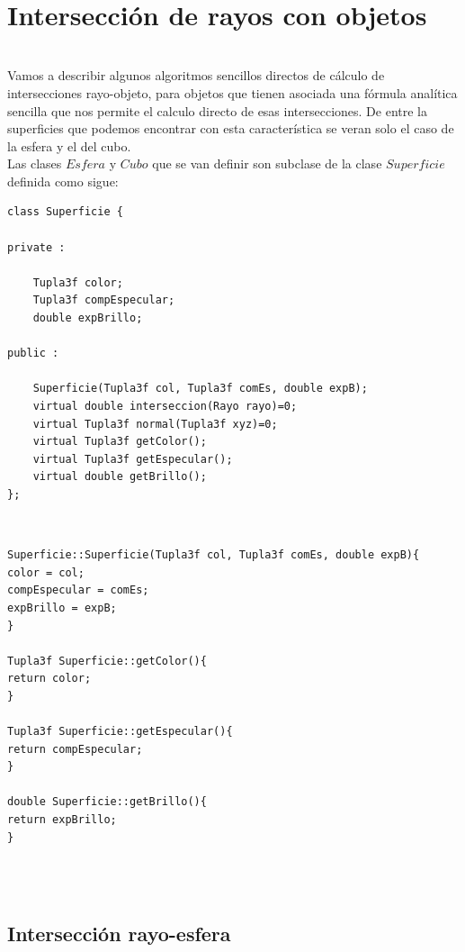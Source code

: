 ${ }$\\
\section{Intersección de rayos con objetos}\label{cap:intRO}
${ }$\\

Vamos a describir algunos algoritmos sencillos directos de cálculo de intersecciones rayo-objeto, para objetos que tienen asociada una fórmula analítica sencilla que nos permite el calculo directo de esas intersecciones. De entre la superficies que podemos encontrar con esta característica se veran solo el caso de la esfera y el del cubo.
${ }$\\

Las clases $Esfera$ y $Cubo$ que se van definir son subclase de la clase $Superficie$ definida como sigue:
${ }$\\

\begin{lstlisting}[style=Consola]
class Superficie {

private :

	Tupla3f color;
	Tupla3f compEspecular;
	double expBrillo;

public :

	Superficie(Tupla3f col, Tupla3f comEs, double expB);
	virtual double interseccion(Rayo rayo)=0;
	virtual Tupla3f normal(Tupla3f xyz)=0;
	virtual Tupla3f getColor();
	virtual Tupla3f getEspecular();
	virtual double getBrillo();
};
\end{lstlisting}
${ }$\\

\begin{lstlisting}[style=Consola]
Superficie::Superficie(Tupla3f col, Tupla3f comEs, double expB){
color = col;
compEspecular = comEs;
expBrillo = expB;
}

Tupla3f Superficie::getColor(){
return color;
}

Tupla3f Superficie::getEspecular(){
return compEspecular;
}

double Superficie::getBrillo(){
return expBrillo;
}

\end{lstlisting}
${ }$\\

${ }$\\
\subsection{Intersección rayo-esfera}
${ }$\\

